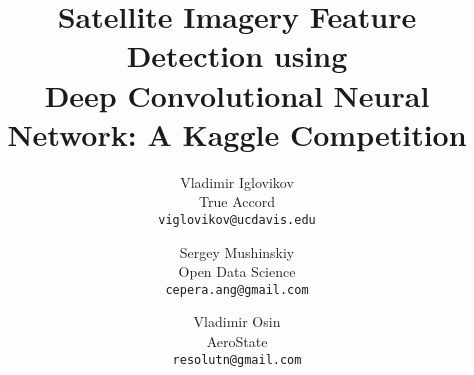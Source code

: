\documentclass[10pt,twocolumn,letterpaper]{article}
\begin{document}
\title{Satellite Imagery Feature Detection using \\ Deep Convolutional Neural Network: A Kaggle Competition}

\author{Vladimir Iglovikov\\
True Accord\\
{\tt\small viglovikov@ucdavis.edu}

\and
Sergey Mushinskiy\\
Open Data Science\\
{\tt\small cepera.ang@gmail.com}

\and
Vladimir Osin\\
AeroState\\
{\tt\small resolutn@gmail.com}

}









\renewcommand\Authands{ and }

\maketitle
\end{document}
